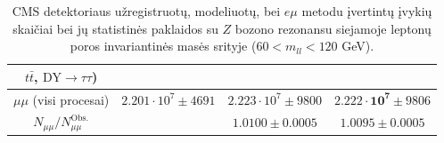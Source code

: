 \documentclass[a4paper, 12pt]{article}
\newcommand{\emu}{e\mu}
\newcommand{\mumu}{\mu\mu}
\newcommand{\DYtau}{\mathrm{DY} \! \rightarrow \! \tau\tau}
\begin{document}
\begin{centering}
\begin{table}
\begin{tabular}{|c|c|c|c|}
	$t\bar{t}$, $\DYtau$) & & & \\
	\hline
	
	\multirow{2}{8em}{\centering $\mumu$ (visi procesai)} &
	\multirow{2}{7em}{\centering $2.201 \cdot 10^7 \pm 4691$} &
	\multirow{2}{10em}{\centering $2.223 \cdot 10^7 \pm 9800$}
	&\multirow{2}{10em}{\centering $\mathbf{2.222 \cdot 10^7} \pm 9806$} \\
	
 	& & & \\
	\hline
	
	\multirow{2}{8em}{\centering $N_{\mumu}/N_{\mumu}^{\mathrm{Obs.}}$} &
	\multirow{2}{7em}{\centering 1} &
	\multirow{2}{10em}{\centering $1.0100 \pm 0.0005$} &
	\multirow{2}{10em}{\centering $1.0095 \pm 0.0005$} \\
	
 	& & & \\
	\hline
\end{tabular}
	\caption{\label{table:finalResults_Z} \small
	CMS detektoriaus užregistruotų, modeliuotų, bei $\emu$ metodu įvertintų įvykių skaičiai	bei jų statistinės
	paklaidos su $Z$ bozono rezonansu siejamoje leptonų poros invariantinės masės srityje ($60<m_{ll}<120$ GeV).}
\end{table}
\end{centering}
\end{document}
